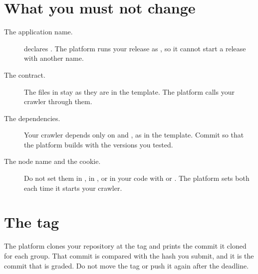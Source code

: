 \documentclass{article}
\begin{document}
\section{What you must not change}
\label{sec:unchanged}

\begin{description}
    \item[The application name.]  declares . The
    platform runs your release as , so it cannot start a release with
    another name.

    \item[The contract.] The files in  stay as they are in the
    template. The platform calls your crawler through them.

    \item[The dependencies.] Your crawler depends only on  and ,
    as in the template. Commit  so that the platform builds with the
    versions you tested.

    \item[The node name and the cookie.] Do not set them in , in
    , or in your code with  or
    . The platform sets both each time it starts your crawler.
\end{description}

\section{The tag}

The platform clones your repository at the tag and prints the commit it cloned for each
group. That commit is compared with the hash you submit, and it is the commit that is
graded. Do not move the tag or push it again after the deadline.
\end{document}
